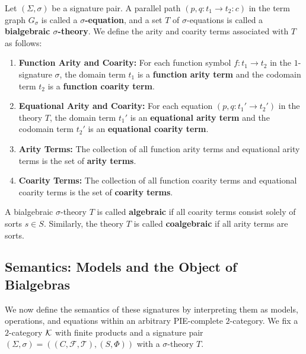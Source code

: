 \begin{definition}
   Let $(\Sigma,\sigma)$ be a signature pair. A parallel path $(p, q \colon t_1 \to t_2\colon c)$ in the term graph $G_\sigma$ is called a \textbf{$\sigma$-equation}, and a set $T$ of $\sigma$-equations is called a \textbf{bialgebraic $\sigma$-theory}. We define the arity and coarity terms associated with $T$ as follows:
   \begin{enumerate}
       \item \textbf{Function Arity and Coarity:} For each function symbol $f \colon t_1 \to t_2$ in the $1$-signature $\sigma$, the domain term $t_1$ is a \textbf{function arity term} and the codomain term $t_2$ is a \textbf{function coarity term}.
       \item \textbf{Equational Arity and Coarity:} For each equation $(p, q \colon t_1' \to t_2')$ in the theory $T$, the domain term $t_1'$ is an \textbf{equational arity term} and the codomain term $t_2'$ is an \textbf{equational coarity term}.
       \item \textbf{Arity Terms:} The collection of all function arity terms and equational arity terms is the set of \textbf{arity terms}.
       \item \textbf{Coarity Terms:} The collection of all function coarity terms and equational coarity terms is the set of \textbf{coarity terms}.
   \end{enumerate}
   A bialgebraic $\sigma$-theory $T$ is called \textbf{algebraic} if all coarity terms consist solely of sorts $s \in S$. Similarly, the theory $T$ is called \textbf{coalgebraic} if all arity terms are sorts.
\end{definition}

\subsection{Semantics: Models and the Object of Bialgebras}

We now define the semantics of these signatures by interpreting them as models, operations, and equations within an arbitrary PIE-complete $2$-category. We fix a $2$-category $\mathcal{K}$ with finite products and a signature pair $(\Sigma, \sigma) = ((C,\mathcal{F}, \mathcal{T}),(S,\Phi))$ with a $\sigma$-theory $T$. 

